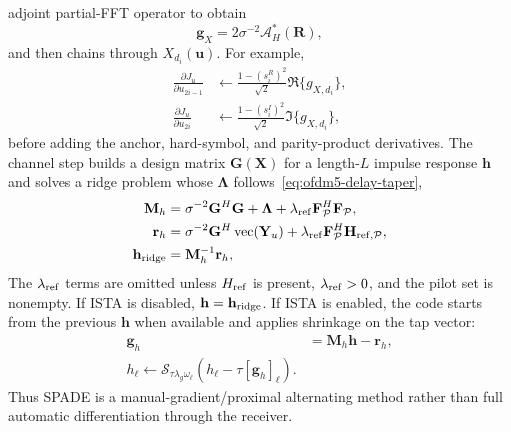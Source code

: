 \documentclass[journal]{IEEEtran}
\begin{document}
adjoint partial-FFT operator to obtain
\begin{equation}
  \mathbf g_X
  =2\sigma^{-2}\mathcal A_H^*(\mathbf R),
  \label{eq:ofdm5-spade-adjoint}
\end{equation}
and then chains through \(X_{d_i}(\mathbf u)\). For example,
\begin{equation}
\begin{aligned}
  \frac{\partial J_u}{\partial u_{2i-1}}
    &\leftarrow \frac{1-(s_i^R)^2}{\sqrt2}
       \Re\{g_{X,d_i}\},\\
  \frac{\partial J_u}{\partial u_{2i}}
    &\leftarrow \frac{1-(s_i^I)^2}{\sqrt2}
       \Im\{g_{X,d_i}\},
\end{aligned}
  \label{eq:ofdm5-spade-chain}
\end{equation}
before adding the anchor, hard-symbol, and parity-product derivatives. The
channel step builds a design matrix \(\mathbf G(\mathbf X)\) for a length-\(L\)
impulse response \(\mathbf h\) and solves a ridge problem whose
\(\boldsymbol\Lambda\) follows~\eqref{eq:ofdm5-delay-taper},
\begin{equation}
\begin{aligned}
  \mathbf M_h
  &=
  \sigma^{-2}\mathbf G^H\mathbf G+\boldsymbol\Lambda
  +\lambda_{\rm ref}\mathbf F_{\mathcal P}^H\mathbf F_{\mathcal P},\\
  \mathbf r_h
  &=
  \sigma^{-2}\mathbf G^H\operatorname{vec}(\mathbf Y_u)
  +\lambda_{\rm ref}\mathbf F_{\mathcal P}^H
        \mathbf H_{{\rm ref},\mathcal P},\\
  \mathbf h_{\rm ridge}
  &=\mathbf M_h^{-1}\mathbf r_h ,
\end{aligned}
  \label{eq:ofdm5-spade-h-ridge}
\end{equation}
The \(\lambda_{\rm ref}\) terms are omitted unless \(H_{\rm ref}\) is present,
\(\lambda_{\rm ref}>0\), and the pilot set is nonempty. If ISTA is disabled,
\(\mathbf h=\mathbf h_{\rm ridge}\). If ISTA is enabled, the code starts from
the previous \(\mathbf h\) when available and applies shrinkage on the tap vector:
\begin{equation}
\begin{aligned}
  \mathbf g_h&=\mathbf M_h\mathbf h-\mathbf r_h,\\
  h_\ell\leftarrow
  \mathcal S_{\tau\lambda_g\omega_\ell}
  \left(h_\ell-\tau[\mathbf g_h]_\ell\right).
\end{aligned}
  \label{eq:ofdm5-spade-ista}
\end{equation}
Thus SPADE is a manual-gradient/proximal alternating method rather than full
automatic differentiation through the receiver.
\end{document}
